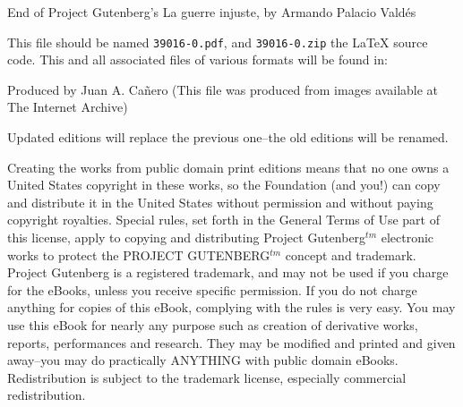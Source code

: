 
\begin{chapter}{End of Project Gutenberg's La guerre injuste, by
Armando Palacio Valdés}

This file should be named \texttt{39016-0.pdf}, and \texttt{39016-0.zip}
the \LaTeX{} source code. This and all associated files of various formats
will be found in:\\

Produced by Juan A. Ca\~nero (This file was
produced from images available at The Internet Archive)


Updated editions will replace the previous one--the old editions
will be renamed.

Creating the works from public domain print editions means that no
one owns a United States copyright in these works, so the Foundation
(and you!) can copy and distribute it in the United States without
permission and without paying copyright royalties.  Special rules,
set forth in the General Terms of Use part of this license, apply to
copying and distributing Project Gutenberg$^{tm}$ electronic works to
protect the PROJECT GUTENBERG$^{tm}$ concept and trademark. 
Project Gutenberg is a registered trademark, and may not be used if you
charge for the eBooks, unless you receive specific permission.  If you
do not charge anything for copies of this eBook, complying with the
rules is very easy.  You may use this eBook for nearly any purpose
such as creation of derivative works, reports, performances and
research.  They may be modified and printed and given away--you may do
practically ANYTHING with public domain eBooks.  Redistribution is
subject to the trademark license, especially commercial
redistribution.

\end{chapter}

